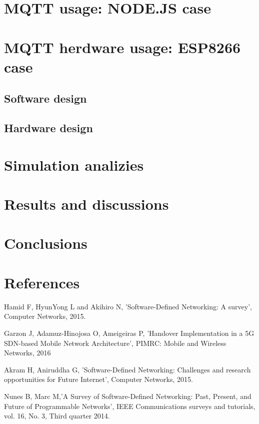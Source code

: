 \documentclass[12pt]{article}
\begin{document}
\section{MQTT usage: NODE.JS case}

\section{MQTT herdware usage: ESP8266 case}

\subsection{Software design}

\subsection{Hardware design}

\section{Simulation analizies}

\section{Results and discussions}

\section{Conclusions}



\section{References}
      Hamid F, HyunYong L and Akihiro N, ’Software-Defined Networking: A survey’, Computer Networks, 2015.

      Garzon J, Adamuz-Hinojosa O, Ameigeiras P, ’Handover Implementation in a 5G SDN-based Mobile Network Architecture’, PIMRC: Mobile and Wireless Networks, 2016

      Akram H, Aniruddha G, ’Software-Defined Networking: Challenges and research opportunities for Future Internet’, Computer Networks, 2015.

      Nunes B, Marc M,’A Survey of Software-Defined Networking: Past, Present, and Future of Programmable Networks’, IEEE Communications surveys and tutorials, vol. 16, No. 3, Third quarter 2014.
\end{document}
